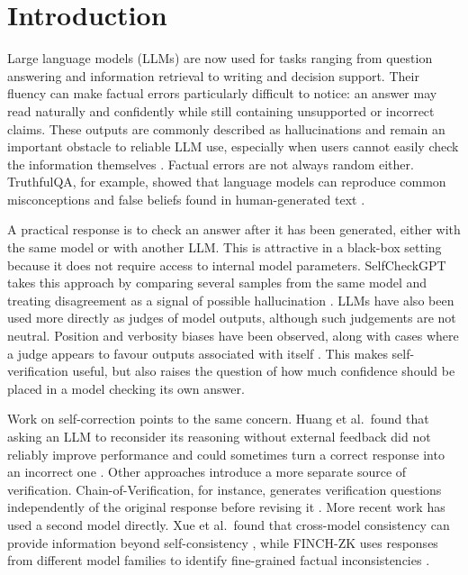 \documentclass[11pt,a4paper]{article}
\begin{document}
	\setcounter{page}{1}
	
	\section{Introduction}
	
	Large language models (LLMs) are now used for tasks ranging from question answering and information retrieval to writing and decision support. Their fluency can make factual errors particularly difficult to notice: an answer may read naturally and confidently while still containing unsupported or incorrect claims. These outputs are commonly described as hallucinations and remain an important obstacle to reliable LLM use, especially when users cannot easily check the information themselves \cite{huang2025survey}. Factual errors are not always random either. TruthfulQA, for example, showed that language models can reproduce common misconceptions and false beliefs found in human-generated text \cite{lin2022truthfulqa}.
	
	A practical response is to check an answer after it has been generated, either with the same model or with another LLM. This is attractive in a black-box setting because it does not require access to internal model parameters. SelfCheckGPT takes this approach by comparing several samples from the same model and treating disagreement as a signal of possible hallucination \cite{manakul2023selfcheckgpt}. LLMs have also been used more directly as judges of model outputs, although such judgements are not neutral. Position and verbosity biases have been observed, along with cases where a judge appears to favour outputs associated with itself \cite{zheng2023judging}. This makes self-verification useful, but also raises the question of how much confidence should be placed in a model checking its own answer.
	
	Work on self-correction points to the same concern. Huang et al.\ found that asking an LLM to reconsider its reasoning without external feedback did not reliably improve performance and could sometimes turn a correct response into an incorrect one \cite{huang2024selfcorrect}. Other approaches introduce a more separate source of verification. Chain-of-Verification, for instance, generates verification questions independently of the original response before revising it \cite{dhuliawala2024chain}. More recent work has used a second model directly. Xue et al.\ found that cross-model consistency can provide information beyond self-consistency \cite{xue2025verify}, while FINCH-ZK uses responses from different model families to identify fine-grained factual inconsistencies \cite{goel2025zero}.
	
\end{document}
